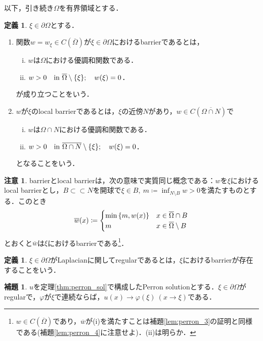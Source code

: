 \documentclass[a4paper]{ltjsarticle}
\newcommand{\Om}{\Omega}
\newcommand{\pOm}{\partial\Omega}
\newcommand{\Ombar}{\overline{\Omega}}
\newcommand{\ssubset}{\subset\subset}
\newcommand{\inn}{\quad\text{in}\ }
\newcommand{\1}{\mathbbm{1}}
\numberwithin{equation}{section}
\theoremstyle{definition}
\newtheorem{dfn}[thm]{定義}
\newtheorem{lem}[thm]{補題}
\newtheorem{rmk}[thm]{注意}
\begin{document}
以下，引き続き$\Om$を有界領域とする．
\begin{dfn}
    $\xi\in\pOm$とする．
    \begin{enumerate}
        \item 関数$w=w_{\xi}\in C(\Ombar)$が$\xi\in\pOm$におけるbarrierであるとは，
        \begin{enumerate}[(i)]
            \item $w$は$\Om$における優調和関数である．
            \item $w>0\inn \Ombar\setminus\qty{\xi};\quad w(\xi)=0$．
        \end{enumerate}
        が成り立つことをいう．
        \item $w$が$\xi$のlocal barrierであるとは，$\xi$の近傍$N$があり，$w\in C(\overline{\Om\cap N})$で
        \begin{enumerate}[(i)]
            \item $w$は$\Om\cap N$における優調和関数である．
            \item $w>0\inn \overline{\Om\cap N}\setminus\qty{\xi};\quad w(\xi)=0$．
        \end{enumerate}
        となることをいう．
    \end{enumerate}
\end{dfn}
\begin{rmk}
    barrierとlocal barrierは，次の意味で実質同じ概念である：$w$を$\xi$におけるlocal barrierとし，$B\ssubset N$を開球で$\xi\in B,\ m\coloneqq\inf_{N\setminus B}w>0$を満たすものとする．このとき
    \begin{equation}
        \overline{w}(x)\coloneqq\begin{cases}
            \min\qty{m,w(x)} & x\in\Ombar\cap B\\
            m & x\in \Ombar\setminus B 
        \end{cases}
    \end{equation}
    とおくと$\overline{w}$は$\xi$におけるbarrierである\footnote{$w\in C(\Ombar)$であり，$\overline{w}$が(i)を満たすことは補題\ref{lem:perron_3}の証明と同様である(補題\ref{lem:perron_4}に注意せよ)．(ii)は明らか．}．
\end{rmk}
\begin{dfn}
    $\xi\in\pOm$がLaplacianに関してregularであるとは，$\xi$におけるbarrierが存在することをいう．
\end{dfn}
\begin{lem}
    $u$を定理\ref{thm:perron_sol}で構成したPerron solutionとする．$\xi\in\pOm$がregularで，$\varphi$が$\xi$で連続ならば，$u(x)\to \varphi(\xi)\ (x\to\xi)$である．
\end{lem}
\end{document}
